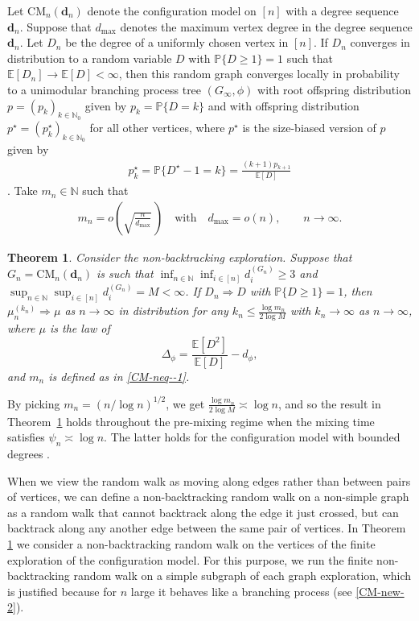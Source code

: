 \documentclass[11pt]{article}
\numberwithin{equation}{section}
\theoremstyle{plain}
\newtheorem{theorem}{Theorem}[section]
\newcommand{\N}{\mathbb N}
\newcommand{\weak}{\Longrightarrow}
\newcommand{\E}{\mathbb E}
\renewcommand{\P}{\mathbb P}
\newcommand{\CM}{\mathrm{CM}}
\begin{document}
Let $\CM_{n}(\mathbf{d}_{n})$ denote the configuration model on $[n]$ with a degree sequence $\mathbf{d}_{n}$. Suppose that $d_{\max}$ denotes the maximum vertex degree in the degree sequence $\mathbf{d}_{n}$. 
Let $D_{n}$ be the degree of a uniformly chosen vertex in $[n]$. If $D_{n}$ converges in distribution to a random variable $D$ with $\P\{D\geq 1\}=1$ such that $\E[D_{n}] \to \E[D]<\infty$, then this random graph converges locally in probability to a unimodular branching process tree $(G_{\infty},\phi)$ with root offspring distribution $p=(p_{k})_{k\in \N_0}$ given by $p_{k} = \P\{D=k\}$ and with offspring distribution $p^{\star}=(p^{\star}_{k})_{k\in \N_0}$ for all other vertices, where $p^{\star}$ is the size-biased version of $p$ given by
\begin{align}
\label{CM-neq--2}
p^{\star}_{k} =\P\{D^{\star}-1=k\} = \frac{(k+1)p_{k+1}}{\E[D]}
\end{align}
\cite[Theorem 4.1 and Definition 1.26]{RvdH2}. Take $m_{n}\in\N$ such that
\begin{align}
\label{CM-neq--1}
m_{n}=o\left(\sqrt{\frac{n}{d_{\max}}}\,\right)\quad \text{with}\quad d_{\max}=o(n),\qquad n\to \infty.
\end{align}

\begin{theorem}
\label{thmA2}
Consider the non-backtracking exploration. Suppose that $G_{n}=\CM_{n}(\mathbf{d}_{n})$ is such that $\inf_{n\in\N}\inf_{i\in[n]} d_{i}^{(G_{n})} \geq 3$ and $\sup_{n\in\N}\sup_{i\in[n]}d_{i}^{(G_{n})} = M < \infty$. If $D_n\weak D$ with $\P\{D\geq 1\}=1$, then $\mu_{n}^{(k_n)} \weak \mu$ as $n\to\infty$ in distribution for any $k_{n}\leq \frac{\log m_{n}}{2\log M}$ with $k_{n}\to\infty$ as $n\to\infty$, where $\mu$ is the law of
\[
\Delta_{\phi}= \frac{\E[D^2]}{\E[D]} -d_{\phi},
\]
and $m_n$ is defined as in \eqref{CM-neq--1}. 
\end{theorem}

\noindent
By picking $m_n = (n/\log n)^{1/2}$, we get $\frac{\log m_{n}}{2\log M} \asymp \log n$, and so the result in Theorem~\ref{thmA2} holds throughout the pre-mixing regime when the mixing time satisfies $\psi_n \asymp \log n$. The latter holds for the configuration model with bounded degrees \cite{BenHS}.

When we view the random walk as moving along edges rather than between pairs of vertices, we can define a non-backtracking random walk on a non-simple graph as a random walk that cannot backtrack along the edge it just crossed, but can backtrack along any another edge between the same pair of vertices. In Theorem \ref{thmA2} we consider a non-backtracking random walk on the vertices of the finite exploration of the configuration model. For this purpose, we run the finite non-backtracking random walk on a simple subgraph of each graph exploration, which is justified because for $n$ large it behaves like a branching process (see \eqref{CM-new-2}).
\end{document}
